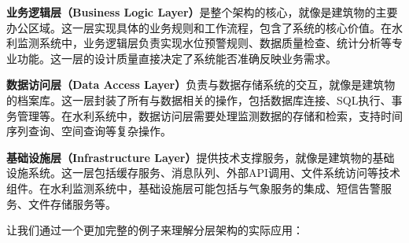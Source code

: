 \textbf{业务逻辑层（Business Logic Layer）}是整个架构的核心，就像是建筑物的主要办公区域。这一层实现具体的业务规则和工作流程，包含了系统的核心价值。在水利监测系统中，业务逻辑层负责实现水位预警规则、数据质量检查、统计分析等专业功能。这一层的设计质量直接决定了系统能否准确反映业务需求。

\textbf{数据访问层（Data Access Layer）}负责与数据存储系统的交互，就像是建筑物的档案库。这一层封装了所有与数据相关的操作，包括数据库连接、SQL执行、事务管理等。在水利系统中，数据访问层需要处理监测数据的存储和检索，支持时间序列查询、空间查询等复杂操作。

\textbf{基础设施层（Infrastructure Layer）}提供技术支撑服务，就像是建筑物的基础设施系统。这一层包括缓存服务、消息队列、外部API调用、文件系统访问等技术组件。在水利监测系统中，基础设施层可能包括与气象服务的集成、短信告警服务、文件存储服务等。

让我们通过一个更加完整的例子来理解分层架构的实际应用：

